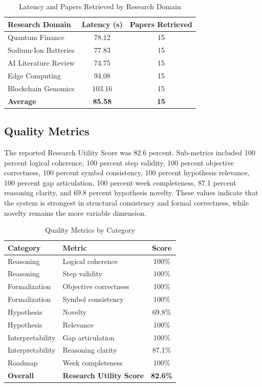 \documentclass[conference]{IEEEtran}
\begin{document}
\begin{table}[htbp]
\caption{Latency and Papers Retrieved by Research Domain}
\begin{center}
\begin{tabular}{lcc}
\toprule
\textbf{Research Domain} & \textbf{Latency (s)} & \textbf{Papers Retrieved} \\
\midrule
Quantum Finance & 78.12 & 15 \\
Sodium-Ion Batteries & 77.83 & 15 \\
AI Literature Review & 74.75 & 15 \\
Edge Computing & 94.08 & 15 \\
Blockchain Genomics & 103.16 & 15 \\
\midrule
\textbf{Average} & \textbf{85.58} & \textbf{15} \\
\bottomrule
\end{tabular}
\label{tab:latency}
\end{center}
\end{table}

\subsection{Quality Metrics}
The reported Research Utility Score was 82.6 percent. Sub-metrics included 100 percent logical coherence, 100 percent step validity, 100 percent objective correctness, 100 percent symbol consistency, 100 percent hypothesis relevance, 100 percent gap articulation, 100 percent week completeness, 87.1 percent reasoning clarity, and 69.8 percent hypothesis novelty. These values indicate that the system is strongest in structural consistency and formal correctness, while novelty remains the more variable dimension.

\begin{table}[htbp]
\caption{Quality Metrics by Category}
\begin{center}
\begin{tabular}{llc}
\toprule
\textbf{Category} & \textbf{Metric} & \textbf{Score} \\
\midrule
Reasoning & Logical coherence & 100\% \\
Reasoning & Step validity & 100\% \\
Formalization & Objective correctness & 100\% \\
Formalization & Symbol consistency & 100\% \\
Hypothesis & Novelty & 69.8\% \\
Hypothesis & Relevance & 100\% \\
Interpretability & Gap articulation & 100\% \\
Interpretability & Reasoning clarity & 87.1\% \\
Roadmap & Week completeness & 100\% \\
\midrule
\textbf{Overall} & \textbf{Research Utility Score} & \textbf{82.6\%} \\
\bottomrule
\end{tabular}
\label{tab:quality}
\end{center}
\end{table}
\end{document}
